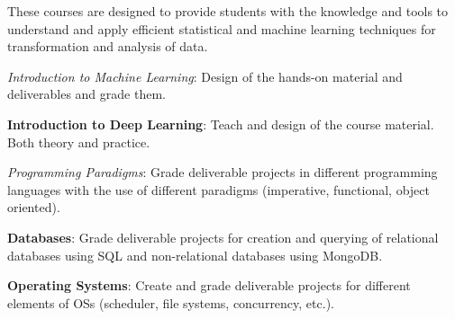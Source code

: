 \documentclass[]{deedy-resume-openfont}
\begin{document}
These courses are designed to provide students with the knowledge and tools 
to understand and apply efficient statistical and machine learning techniques
for transformation and analysis of data.
\begin{tightemize}
\item {\it Introduction to Machine Learning}: Design of the hands-on material and
deliverables and grade them.
\item {\bf Introduction to Deep Learning}: Teach and design of the course material. 
Both theory and practice.
\end{tightemize}
\sectionsep

\begin{tightemize}
\item {\it Programming Paradigms}: Grade deliverable projects in different 
programming languages with the use of different paradigms (imperative, 
functional, object oriented).
\item {\bf Databases}: Grade deliverable projects for creation and querying of 
relational databases using SQL and non-relational databases using MongoDB.
\item {\bf Operating Systems}: Create and grade deliverable projects for
different elements of OSs (scheduler, file systems, concurrency, etc.).
\end{tightemize}
\sectionsep
\end{document}

